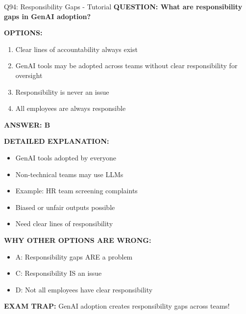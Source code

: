 \documentclass[8pt]{beamer}
\begin{document}
	\begin{frame}{Q94: Responsibility Gaps - Tutorial}
		\fontsize{6.5}{7.5}\selectfont
		\textbf{QUESTION: What are responsibility gaps in GenAI adoption?}
		
		\vspace{0.1cm}
		\textbf{OPTIONS:}
		\begin{enumerate}
			\item Clear lines of accountability always exist
			\item GenAI tools may be adopted across teams without clear responsibility for oversight
			\item Responsibility is never an issue
			\item All employees are always responsible
		\end{enumerate}
		
		\vspace{0.1cm}
		\textcolor{myblue}{\textbf{ANSWER: B}}
		
		\vspace{0.1cm}
		\textbf{DETAILED EXPLANATION:}
		\begin{itemize}
			\item GenAI tools adopted by everyone
			\item Non-technical teams may use LLMs
			\item Example: HR team screening complaints
			\item Biased or unfair outputs possible
			\item Need clear lines of responsibility
		\end{itemize}
		
		\vspace{0.1cm}
		\textcolor{myred}{\textbf{WHY OTHER OPTIONS ARE WRONG:}}
		\begin{itemize}
			\item \textcolor{myred}{A:} Responsibility gaps ARE a problem
			\item \textcolor{myred}{C:} Responsibility IS an issue
			\item \textcolor{myred}{D:} Not all employees have clear responsibility
		\end{itemize}
		
		\textcolor{myred}{\textbf{EXAM TRAP:}} GenAI adoption creates \textcolor{myblue}{responsibility gaps} across teams!
	\end{frame}
	
\end{document}
